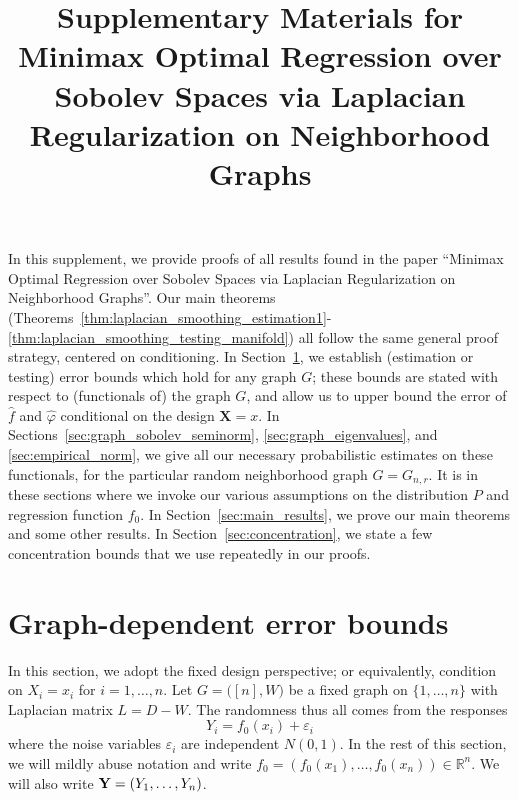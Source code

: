\documentclass[twoside]{article}
\newcommand{\Reals}{\mathbb{R}}
\newcommand{\1}{\mathbf{1}}
\newcommand{\Lap}{L}
\newcommand{\wh}[1]{\widehat{#1}}
\theoremstyle{definition}
\theoremstyle{remark}
\begin{document}
	
\title{Supplementary Materials for Minimax Optimal Regression over Sobolev Spaces via Laplacian Regularization on Neighborhood Graphs}
\date{}
\maketitle

In this supplement, we provide proofs of all results found in the paper ``Minimax Optimal Regression over Sobolev Spaces via Laplacian Regularization on Neighborhood Graphs''. Our main theorems (Theorems~\ref{thm:laplacian_smoothing_estimation1}-\ref{thm:laplacian_smoothing_testing_manifold}) all follow the same general proof strategy, centered on conditioning. In Section~\ref{sec:fixed_graph_error_bounds}, we establish (estimation or testing) error bounds which hold for any graph $G$; these bounds are stated with respect to (functionals of) the graph $G$, and allow us to upper bound the error of $\wh{f}$ and $\wh{\varphi}$ conditional on the design $\mathbf{X} = x$. In Sections~\ref{sec:graph_sobolev_seminorm}, \ref{sec:graph_eigenvalues}, and \ref{sec:empirical_norm}, we give all our necessary probabilistic estimates on these functionals, for the particular random neighborhood graph $G = G_{n,r}$. It is in these sections where we invoke our various assumptions on the distribution $P$ and regression function $f_0$. In Section~\ref{sec:main_results}, we prove our main theorems and some other results. In Section~\ref{sec:concentration}, we state a few concentration bounds that we use repeatedly in our proofs.

\section{Graph-dependent error bounds}
\label{sec:fixed_graph_error_bounds}
In this section, we adopt the fixed design perspective; or equivalently, condition on $X_i = x_i$ for $i = 1,\ldots,n$. Let $G = \bigl([n],W\bigr)$ be a fixed graph on $\{1,\ldots,n\}$ with Laplacian matrix $\Lap = D - W$. The randomness thus all comes from the responses 
\begin{equation}
\label{eqn:fixed_graph_regression_model}
Y_i = f_{0}(x_i) + \varepsilon_i
\end{equation}
where the noise variables $\varepsilon_i$ are independent $N(0,1)$. In the rest of this section, we will mildly abuse notation and write $f_0 = (f_0(x_1),\ldots,f_0(x_n)) \in \Reals^n$. We will also write ${\bf Y} = (Y_1,\ldots,Y_n)$.
\end{document}
